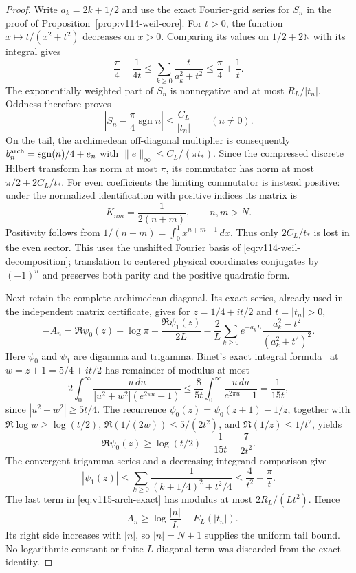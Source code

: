 \documentclass[11pt]{article}
\theoremstyle{remark}
\begin{document}
\begin{proof}
Write $a_k=2k+1/2$ and use the exact Fourier-grid series for $S_n$
in the proof of Proposition~\ref{prop:v114-weil-core}.
For $t>0$, the function $x\mapsto t/(x^2+t^2)$ decreases on $x>0$.
Comparing its values on $1/2+2\mathbb N$ with its integral gives
\[
 \frac\pi4-\frac1{4t}
 \le\sum_{k\ge0}\frac{t}{a_k^2+t^2}
 \le\frac\pi4+\frac1t.
\]
The exponentially weighted part of $S_n$ is nonnegative and at most
$R_L/|t_n|$. Oddness therefore proves
\begin{equation}\label{eq:v115-S-sharp}
 \left|S_n-\frac\pi4\operatorname{sgn}n\right|
       \le\frac{C_L}{|t_n|}\qquad(n\ne0).
\end{equation}
On the tail, the archimedean off-diagonal multiplier is consequently
$b_n^{\rm arch}=\operatorname{sgn}(n)/4+e_n$ with
$\|e\|_\infty\le C_L/(\pi t_*)$.
Since the compressed discrete Hilbert transform has norm at most $\pi$,
its commutator has norm at most $\pi/2+2C_L/t_*$.
For even coefficients the limiting commutator is instead positive:
under the normalized identification with positive indices its matrix is
\[
 K_{nm}=\frac1{2(n+m)},\qquad n,m>N.
\]
Positivity follows from
$1/(n+m)=\int_0^1x^{n+m-1}\,dx$. Thus only $2C_L/t_*$ is lost in
the even sector. This uses the unshifted Fourier basis of
\eqref{eq:v114-weil-decomposition}; translation to centered physical
coordinates conjugates by $(-1)^n$ and preserves both parity and the
positive quadratic form.

Next retain the complete archimedean diagonal. Its exact series, already
used in the independent matrix certificate, gives for
$z=1/4+it/2$ and $t=|t_n|>0$,
\begin{equation}\label{eq:v115-arch-exact}
 -A_n=\Re\psi_0(z)-\log\pi+\frac{\Re\psi_1(z)}{2L}
 -\frac2L\sum_{k\ge0}e^{-a_kL}
                   \frac{a_k^2-t^2}{(a_k^2+t^2)^2}.
\end{equation}
Here $\psi_0$ and $\psi_1$ are digamma and trigamma.
Binet's exact integral formula~\cite[eq.~5.9.15]{NISTDigamma} at
$w=z+1=5/4+it/2$ has remainder of modulus at most
\[
 2\int_0^\infty\frac{u\,du}
 {|u^2+w^2|(e^{2\pi u}-1)}
 \le\frac8{5t}\int_0^\infty\frac{u\,du}{e^{2\pi u}-1}
 =\frac1{15t},
\]
since $|u^2+w^2|\ge5t/4$. The recurrence
$\psi_0(z)=\psi_0(z+1)-1/z$, together with
$\Re\log w\ge\log(t/2)$,
$\Re(1/(2w))\le5/(2t^2)$, and $\Re(1/z)\le1/t^2$, yields
\[
 \Re\psi_0(z)\ge\log(t/2)-\frac1{15t}-\frac7{2t^2}.
\]
The convergent trigamma series and a decreasing-integrand comparison give
\[
 |\psi_1(z)|\le\sum_{k\ge0}\frac1{(k+1/4)^2+t^2/4}
                 \le\frac4{t^2}+\frac\pi t.
\]
The last term in \eqref{eq:v115-arch-exact} has modulus at most
$2R_L/(Lt^2)$. Hence
\begin{equation}\label{eq:v115-diagonal-sharp}
 -A_n\ge\log\frac{|n|}{L}-E_L(|t_n|).
\end{equation}
Its right side increases with $|n|$, so $|n|=N+1$ supplies the uniform
tail bound. No logarithmic constant or finite-$L$ diagonal term was
discarded from the exact identity.


\end{proof}
\end{document}
